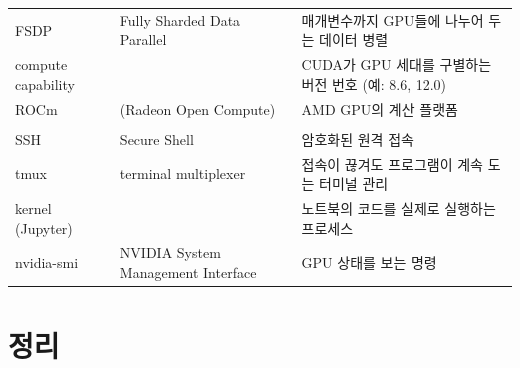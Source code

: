 \documentclass[11pt,a4paper]{article}
\begin{document}
{\begin{longtable}{@{}>{\raggedright\arraybackslash}p{24mm}>{\raggedright\arraybackslash}p{50mm}>{\raggedright\arraybackslash}p{76mm}@{}}
FSDP & Fully Sharded Data Parallel & 매개변수까지 GPU들에 나누어 두는 데이터 병렬 \\
compute capability & & CUDA가 GPU 세대를 구별하는 버전 번호 (예: 8.6, 12.0) \\
ROCm & (Radeon Open Compute) & AMD GPU의 계산 플랫폼 \\
\multicolumn{3}{@{}l}{\textbf{개발 환경}} \\
SSH & Secure Shell & 암호화된 원격 접속 \\
tmux & terminal multiplexer & 접속이 끊겨도 프로그램이 계속 도는 터미널 관리 \\
kernel (Jupyter) & & 노트북의 코드를 실제로 실행하는 프로세스 \\
nvidia-smi & NVIDIA System Management Interface & GPU 상태를 보는 명령 \\
\end{longtable}}

\section{정리}\label{sec:summary}
\end{document}
